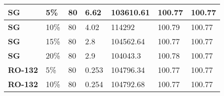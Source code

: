 \begin{table}[h!]
\begin{tabular}{|l|l|l|l|l|l|l|}
SG                         & 5\%                                                                                          & 80                                                                                         & 6.62                                                                                 & 103610.61                                                         & 100.77             & 100.77                                                                \\ \hline
\textbf{SG}                & 10\%                                                                                         & 80                                                                                         & 4.02                                                                                 & 114292                                                            & 100.79             & 100.77                                                                \\ \hline
\textbf{SG}                & 15\%                                                                                         & 80                                                                                         & 2.8                                                                                  & 104562.64                                                         & 100.77             & 100.77                                                                \\ \hline
\textbf{SG}                & 20\%                                                                                         & 80                                                                                         & 2.9                                                                                  & 104043.3                                                          & 100.78             & 100.77                                                                \\ \hline
\textbf{RO-132}            & 5\%                                                                                          & 80                                                                                         & 0.253                                                                                & 104796.34                                                         & 100.77             & 100.77                                                                \\ \hline
\textbf{RO-132}            & 10\%                                                                                         & 80                                                                                         & 0.254                                                                                & 104792.68                                                         & 100.77             & 100.77                                                                \\ \hline

\end{tabular}
\end{table}
